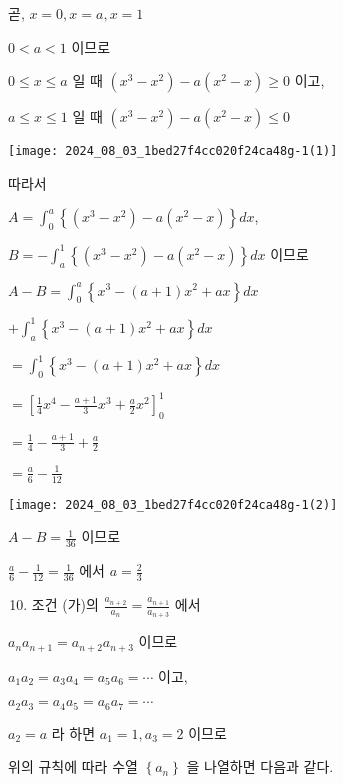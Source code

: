 \documentclass[10pt]{article}
\begin{document}
곧, \(x=0, x=a, x=1\)

\(0<a<1\) 이므로

\(0 \leq x \leq a\) 일 때 \(\left(x^{3}-x^{2}\right)-a\left(x^{2}-x\right) \geq 0\) 이고,

\(a \leq x \leq 1\) 일 때 \(\left(x^{3}-x^{2}\right)-a\left(x^{2}-x\right) \leq 0\)

\begin{center}
\texttt{[image: 2024\_08\_03\_1bed27f4cc020f24ca48g-1(1)]}
\end{center}

따라서

\(A=\int_{0}^{a}\left\{\left(x^{3}-x^{2}\right)-a\left(x^{2}-x\right)\right\} d x\),

\(B=-\int_{a}^{1}\left\{\left(x^{3}-x^{2}\right)-a\left(x^{2}-x\right)\right\} d x\) 이므로

\(A-B=\int_{0}^{a}\left\{x^{3}-(a+1) x^{2}+a x\right\} d x\)

\(+\int_{a}^{1}\left\{x^{3}-(a+1) x^{2}+a x\right\} d x\)

\(=\int_{0}^{1}\left\{x^{3}-(a+1) x^{2}+a x\right\} d x\)

\(=\left[\frac{1}{4} x^{4}-\frac{a+1}{3} x^{3}+\frac{a}{2} x^{2}\right]_{0}^{1}\)

\(=\frac{1}{4}-\frac{a+1}{3}+\frac{a}{2}\)

\(=\frac{a}{6}-\frac{1}{12}\)

\begin{center}
\texttt{[image: 2024\_08\_03\_1bed27f4cc020f24ca48g-1(2)]}
\end{center}

\(A-B=\frac{1}{36}\) 이므로

\(\frac{a}{6}-\frac{1}{12}=\frac{1}{36}\) 에서 \(a=\frac{2}{3}\)

\begin{enumerate}
  \setcounter{enumi}{9}
  \item 조건 (가)의 \(\frac{a_{n+2}}{a_{n}}=\frac{a_{n+1}}{a_{n+3}}\) 에서
\end{enumerate}

\(a_{n} a_{n+1}=a_{n+2} a_{n+3}\) 이므로

\(a_{1} a_{2}=a_{3} a_{4}=a_{5} a_{6}=\cdots\) 이고,

\(a_{2} a_{3}=a_{4} a_{5}=a_{6} a_{7}=\cdots\)

\(a_{2}=a\) 라 하면 \(a_{1}=1, a_{3}=2\) 이므로

위의 규칙에 따라 수열 \(\left\{a_{n}\right\}\) 을 나열하면 다음과 같다.
\end{document}
